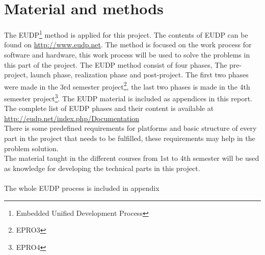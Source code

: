 \chapter{Material and methods}
The EUDP\footnote{Embedded Unified Development Process} method is applied for this project. The contents of EUDP can be found on \url{http://www.eudp.net}. The method is focused on the work process for software and hardware, this work process will be used to solve the problems in this part of the project. The EUDP method consist of four phases, The pre-project, launch phase, realization phase and post-project. The first two phases were made in the 3rd semester project\footnote{EPRO3}, the last two phases is made in the 4th semester project\footnote{EPRO4}. The EUDP material is included as appendices in this report. The complete list of EUDP phases and their content is available at \url{http://eudp.net/index.php/Documentation}\\
There is some predefined requirements for platforms and basic structure of every part in the project that needs to be fulfilled, these requirements may help in the problem solution.\\
The material taught in the different courses from 1st to 4th semester will be used as knowledge for developing the technical parts in this project.\\
\\
The whole EUDP process is included in appendix